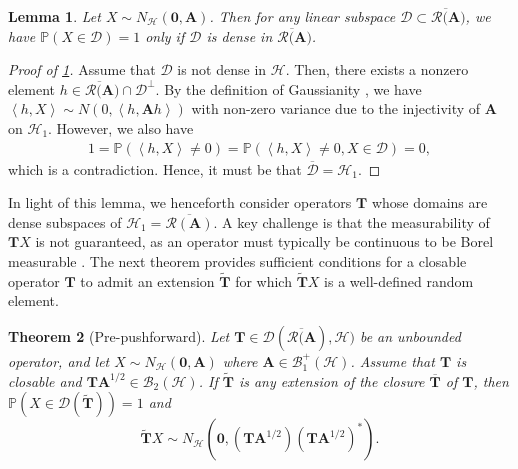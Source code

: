 \documentclass[noinfoline]{imsart}\setcounter{tocdepth}{2}
\renewcommand{\b}[1]{\mathbb{#1}} %
\newcommand{\m}[1]{\mathbf{#1}} %
\renewcommand{\c}[1]{\mathcal{#1}} %
\newcommand{\innpr}[2]{{\left\langle {#1},{#2}\right\rangle}} %
\theoremstyle{plain}
\newtheorem{theorem}{Theorem}[section]
\newtheorem{lemma}[theorem]{Lemma}
\begin{document}
\begin{lemma}\label{lem:a.s.:dense}
Let $X \sim N_{\c{H}}(\m{0}, \m{A})$. Then for any linear subspace $\c{D} \subset \overline{\c{R}(\m{A}})$, we have $\b{P}(X \in \c{D})=1$ only if $\c{D}$ is dense in $\overline{\c{R}(\m{A}})$. 
\end{lemma}
\begin{proof}[Proof of \cref{lem:a.s.:dense}]
Assume that $\c{D}$ is not dense in $\c{H}$. Then, there exists a nonzero element $h \in \overline{\c{R}(\m{A}}) \cap \c{D}^{\perp}$. By the definition of Gaussianity \cite{hsing2015theoretical, da2006introduction}, we have $\innpr{h}{X} \sim N(0, \innpr{h}{\m{A}h})$
with non-zero variance due to the injectivity of $\m A$ on $\c{H}_1$. However, we also have
\begin{align*}
    1 = \b{P}(\innpr{h}{X} \neq 0) = \b{P}(\innpr{h}{X} \neq 0, X \in \c{D}) = 0,
\end{align*}
which is a contradiction. Hence, it must be that $\overline{\c{D}} = \c{H}_{1}$.
\end{proof}

In light of this lemma, we henceforth consider operators $\m{T}$ whose domains are dense subspaces of $\c{H}_{1} = \overline{\c{R}(\m{A})}$. 
A key challenge is that the measurability of 
$\m{T}X$ is not guaranteed, as an operator must typically be continuous to be Borel measurable \cite[Theorem. 9.10]{kechris2012classical}. The next theorem provides sufficient conditions for a closable operator
$\m{T}$ to admit an extension  
$\tilde{\m{T}}$ for which 
$\tilde{\m{T}} X$ is a well-defined random element.

\begin{theorem}[Pre-pushforward]\label{thm:prepush}
Let $\m{T} \in \c{D}(\overline{\c{R}(\m{A}}), \c{H})$ be an unbounded operator, and let $X \sim N_{\c{H}}(\m{0}, \m{A})$ where $\m{A} \in \c{B}_{1}^{+}(\c{H})$. Assume that $\m{T}$ is closable and $\m{T} \m{A}^{1/2} \in \c{B}_{2}(\c{H})$. If $\tilde{\m{T}}$ is any extension of the closure $\overline{\m{T}}$ of $\m{T}$, then $\b{P}(X \in \c{D}(\tilde{\m{T}}))=1$ and
\begin{equation*}
    \tilde{\m{T}} X \sim N_{\c{H}}(\m{0}, (\m{T} \m{A}^{1/2})(\m{T} \m{A}^{1/2})^{*}).
\end{equation*}
\end{theorem}
\end{document}

